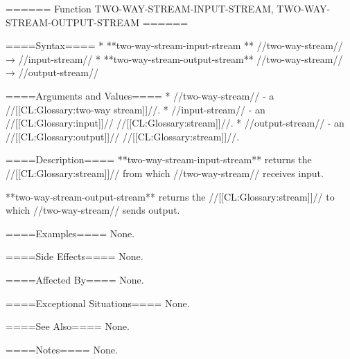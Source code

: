 ====== Function TWO-WAY-STREAM-INPUT-STREAM, TWO-WAY-STREAM-OUTPUT-STREAM ======

====Syntax====
  * **two-way-stream-input-stream ** //two-way-stream// → //input-stream// 
  * **two-way-stream-output-stream** //two-way-stream// → //output-stream//

====Arguments and Values====
  * //two-way-stream// - a //[[CL:Glossary:two-way stream]]//.
  * //input-stream// - an //[[CL:Glossary:input]]// //[[CL:Glossary:stream]]//.
  * //output-stream// - an //[[CL:Glossary:output]]// //[[CL:Glossary:stream]]//.

====Description====
**two-way-stream-input-stream** returns the //[[CL:Glossary:stream]]// from which //two-way-stream// receives input.

**two-way-stream-output-stream** returns the //[[CL:Glossary:stream]]// to which //two-way-stream// sends output.

====Examples====
None.

====Side Effects====
None.

====Affected By====
None.

====Exceptional Situations====
None.

====See Also====
None.

====Notes====
None.

